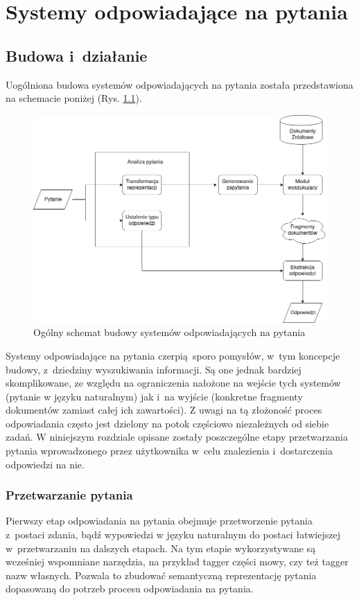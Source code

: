 \documentclass[a4paper, twoside, 12pt]{report}
\begin{document}
\chapter{Systemy odpowiadające na pytania}
    \section{Budowa i~działanie}
        Uogólniona budowa systemów odpowiadających na pytania została przedstawiona na schemacie poniżej (Rys. \ref{QASCHEME})\cite{PASZKA}.
        \begin{figure}[h]
                \centering
                \includegraphics[scale=0.6, angle=90]{qa}
                \caption{Ogólny schemat budowy systemów odpowiadających na pytania}
                \label{QASCHEME}
        \end{figure}
        Systemy odpowiadające na pytania czerpią sporo pomysłów, w~tym koncepcje budowy, z~dziedziny wyszukiwania informacji.
        Są one jednak bardziej skomplikowane, ze względu na ograniczenia nałożone na wejście tych systemów (pytanie w
        języku naturalnym) jak i~na wyjście (konkretne fragmenty dokumentów zamiast całej ich zawartości). Z uwagi
        na tą złożoność proces odpowiadania często jest dzielony na potok częściowo niezależnych od siebie zadań.
        W niniejszym rozdziale opisane zostały poszczególne etapy przetwarzania pytania wprowadzonego przez użytkownika
        w~celu znalezienia i~dostarczenia odpowiedzi na nie.

        \subsection{Przetwarzanie pytania}
            Pierwszy etap odpowiadania na pytania obejmuje przetworzenie pytania z~postaci zdania, bądź wypowiedzi w
            języku naturalnym do postaci łatwiejszej w~przetwarzaniu na dalszych etapach. Na tym etapie wykorzystywane
            są wcześniej wspomniane narzędzia, na przykład tagger części mowy, czy też tagger nazw własnych. Pozwala
            to zbudować semantyczną reprezentację pytania dopasowaną do potrzeb procesu odpowiadania na pytania.
\end{document}
